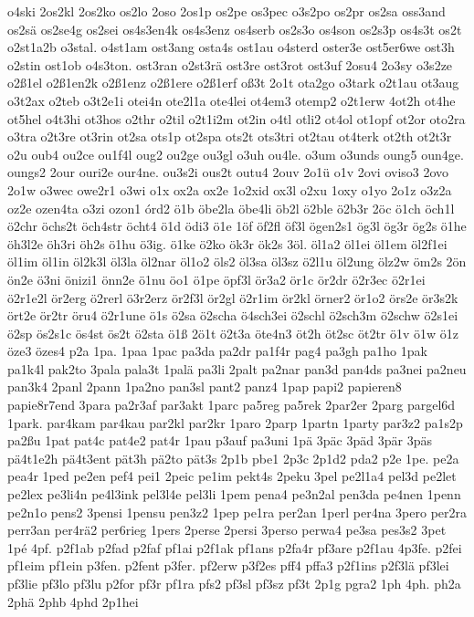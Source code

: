 {o4ski
2os2kl
2os2ko
os2lo
2oso
2os1p
os2pe
os3pec
o3s2po
os2pr
os2sa
oss3and
os2sä
os2se4g
os2sei
os4s3en4k
os4s3enz
os4serb
os2s3o
os4son
os2s3p
os4s3t
os2t
o2st1a2b
o3stal.
o4st1am
ost3ang
osta4s
ost1au
o4sterd
oster3e
ost5er6we
ost3h
o2stin
ost1ob
o4s3ton.
ost3ran
o2st3rä
ost3re
ost3rot
ost3uf
2osu4
2o3sy
o3s2ze
o2ß1el
o2ß1en2k
o2ß1enz
o2ß1ere
o2ß1erf
oß3t
2o1t
ota2go
o3tark
o2t1au
ot3aug
o3t2ax
o2teb
o3t2e1i
otei4n
ote2l1a
ote4lei
ot4em3
otemp2
o2t1erw
4ot2h
ot4he
ot5hel
o4t3hi
ot3hos
o2thr
o2til
o2t1i2m
ot2in
o4tl
otli2
ot4ol
ot1opf
ot2or
oto2ra
o3tra
o2t3re
ot3rin
ot2sa
ots1p
ot2spa
ots2t
ots3tri
ot2tau
ot4terk
ot2th
ot2t3r
o2u
oub4
ou2ce
ou1f4l
oug2
ou2ge
ou3gl
o3uh
ou4le.
o3um
o3unds
oung5
oun4ge.
oungs2
2our
ouri2e
our4ne.
ou3s2i
ous2t
outu4
2ouv
2o1ü
o1v
2ovi
oviso3
2ovo
2o1w
o3wec
owe2r1
o3wi
o1x
ox2a
ox2e
1o2xid
ox3l
o2xu
1oxy
o1yo
2o1z
o3z2a
oz2e
ozen4ta
o3zi
ozon1
órd2
ö1b
öbe2la
öbe4li
öb2l
ö2ble
ö2b3r
2öc
ö1ch
öch1l
ö2chr
öchs2t
öch4str
öcht4
ö1d
ödi3
ö1e
1öf
öf2fl
öf3l
ögen2s1
ög3l
ög3r
ög2s
ö1he
öh3l2e
öh3ri
öh2s
ö1hu
ö3ig.
ö1ke
ö2ko
ök3r
ök2s
3öl.
öl1a2
öl1ei
öl1em
öl2f1ei
öl1im
öl1in
öl2k3l
öl3la
öl2nar
öl1o2
öls2
öl3sa
öl3sz
ö2l1u
öl2ung
ölz2w
öm2s
2ön
ön2e
ö3ni
önizi1
önn2e
ö1nu
öo1
ö1pe
öpf3l
ör3a2
ör1c
ör2dr
ö2r3ec
ö2r1ei
ö2r1e2l
ör2erg
ö2rerl
ö3r2erz
ör2f3l
ör2gl
ö2r1im
ör2kl
örner2
ör1o2
örs2e
ör3s2k
ört2e
ör2tr
öru4
ö2r1une
ö1s
ö2sa
ö2scha
ö4sch3ei
ö2schl
ö2sch3m
ö2schw
ö2s1ei
ö2sp
ös2s1c
ös4st
ös2t
ö2sta
ö1ß
2ö1t
ö2t3a
öte4n3
öt2h
öt2sc
öt2tr
ö1v
ö1w
ö1z
öze3
özes4
p2a
1pa.
1paa
1pac
pa3da
pa2dr
pa1f4r
pag4
pa3gh
pa1ho
1pak
pa1k4l
pak2to
3pala
pala3t
1palä
pa3li
2palt
pa2nar
pan3d
pan4ds
pa3nei
pa2neu
pan3k4
2panl
2pann
1pa2no
pan3sl
pant2
panz4
1pap
papi2
papieren8
papie8r7end
3para
pa2r3af
par3akt
1parc
pa5reg
pa5rek
2par2er
2parg
pargel6d
1park.
par4kam
par4kau
par2kl
par2kr
1paro
2parp
1partn
1party
par3z2
pa1s2p
pa2ßu
1pat
pat4c
pat4e2
pat4r
1pau
p3auf
pa3uni
1pä
3päc
3päd
3pär
3päs
pä4t1e2h
pä4t3ent
pät3h
pä2to
pät3s
2p1b
pbe1
2p3c
2p1d2
pda2
p2e
1pe.
pe2a
pea4r
1ped
pe2en
pef4
pei1
2peic
pe1im
pekt4s
2peku
3pel
pe2l1a4
pel3d
pe2let
pe2lex
pe3li4n
pe4l3ink
pel3l4e
pel3li
1pem
pena4
pe3n2al
pen3da
pe4nen
1penn
pe2n1o
pens2
3pensi
1pensu
pen3z2
1pep
pe1ra
per2an
1perl
per4na
3pero
per2ra
perr3an
per4rä2
per6rieg
1pers
2perse
2persi
3perso
perwa4
pe3sa
pes3s2
3pet
1pé
4pf.
p2f1ab
p2fad
p2faf
pf1ai
p2f1ak
pf1ans
p2fa4r
pf3are
p2f1au
4p3fe.
p2fei
pf1eim
pf1ein
p3fen.
p2fent
p3fer.
pf2erw
p3f2es
pff4
pffa3
p2f1ins
p2f3lä
pf3lei
pf3lie
pf3lo
pf3lu
p2for
pf3r
pf1ra
pfs2
pf3sl
pf3sz
pf3t
2p1g
pgra2
1ph
4ph.
ph2a
2phä
2phb
4phd
2p1hei
}
